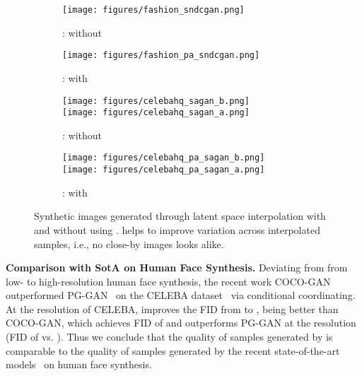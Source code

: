 \documentclass{article}
\begin{document}
\begin{figure*}
	\captionsetup[subfigure]{labelformat=empty}
	\vspace{0em}
	\centering
	\begin{subfigure}{0.48\textwidth}
\texttt{[image: figures/fashion\_sndcgan.png]}
		\caption{\text{}:  without }
	\end{subfigure}
	\hfill
	\begin{subfigure}{0.48\textwidth}
\texttt{[image: figures/fashion\_pa\_sndcgan.png]} 
		\caption{\text{}:  with }
	\end{subfigure}	
	
	\begin{subfigure}{0.8\textwidth}
		\vspace{1.0em}
		\texttt{[image: figures/celebahq\_sagan\_b.png]}\\  
		\texttt{[image: figures/celebahq\_sagan\_a.png]} \caption{\text{}:  without }
	\end{subfigure}
\begin{subfigure}{0.8\textwidth}
		\texttt{[image: figures/celebahq\_pa\_sagan\_b.png]}\\
		\texttt{[image: figures/celebahq\_pa\_sagan\_a.png]} \caption{\text{}:  with }
	\end{subfigure}	
	
	\caption{Synthetic images generated through latent space interpolation with and without using .  helps to improve variation across interpolated samples, i.e., no close-by images looks alike.}	\label{fig:images}
	\vspace{-1.6em}
\end{figure*}

\textbf{Comparison with SotA on Human Face Synthesis.} Deviating from from low- to high-resolution human face synthesis, the recent work COCO-GAN~\cite{lin2019cocogan} outperformed PG-GAN~\cite{karras2018progressive} on the CELEBA dataset~\cite{Liu_Celeba} via conditional coordinating. At the resolution  of CELEBA,  improves the  FID from  to , being better than COCO-GAN, which achieves FID of  and outperforms PG-GAN at the resolution  (FID of  vs. ).
Thus we conclude that the quality of samples generated by  is comparable to the quality of samples generated by the recent state-of-the-art models~\cite{lin2019cocogan,karras2018progressive} on human face synthesis.
\end{document}
